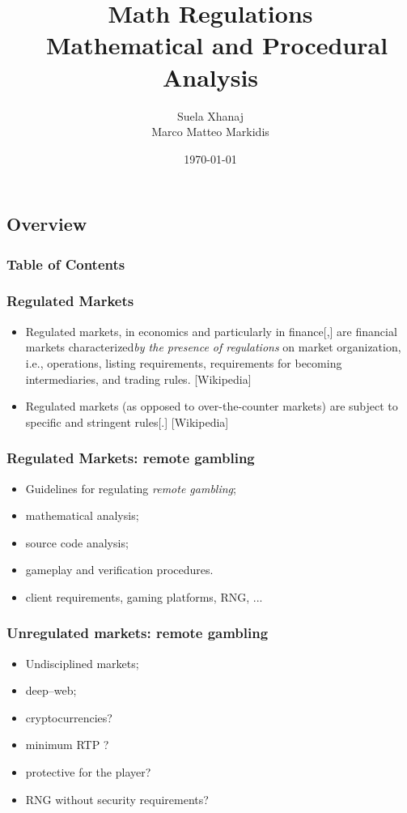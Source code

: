 \documentclass{beamer}
\title{Math Regulations\\~Mathematical and Procedural Analysis}
\author{Suela Xhanaj\\
      Marco Matteo Markidis}
\date{\today}
\begin{document}
\begin{frame}
\section{Overview} %
	\maketitle
\end{frame}

\begin{frame}
\frametitle{Table of Contents}
\tableofcontents
\end{frame}

\begin{frame}
\frametitle{Regulated Markets}
\begin{itemize}
\item<1-> Regulated markets, in economics and particularly in finance[,] are financial markets characterized\emph {by the presence of regulations} on market organization, i.e., operations, listing requirements, requirements for becoming intermediaries, and trading rules. [Wikipedia]
\item<2-> Regulated markets (as opposed to over-the-counter markets) are subject to specific and stringent rules[.] [Wikipedia]
\end{itemize}
\end{frame}

\begin{frame}
\frametitle{Regulated Markets: remote gambling}
\begin{itemize}
\item<1-> Guidelines for regulating \emph{remote gambling};
\item<2-> mathematical analysis;
\item<3-> source code analysis;
\item<4-> gameplay and verification procedures.
\item<5-> client requirements, gaming platforms, RNG, ...
\end{itemize}
\end{frame}

\begin{frame}
\frametitle{Unregulated markets: remote gambling}
\begin{itemize}
\item<1-> Undisciplined markets;
\item<2-> deep--web;
\item<3-> cryptocurrencies?
\item<4-> minimum RTP ?
\item<5-> protective for the player?
\item<6-> RNG without security requirements?
\end{itemize}
\end{frame}
\end{document}
